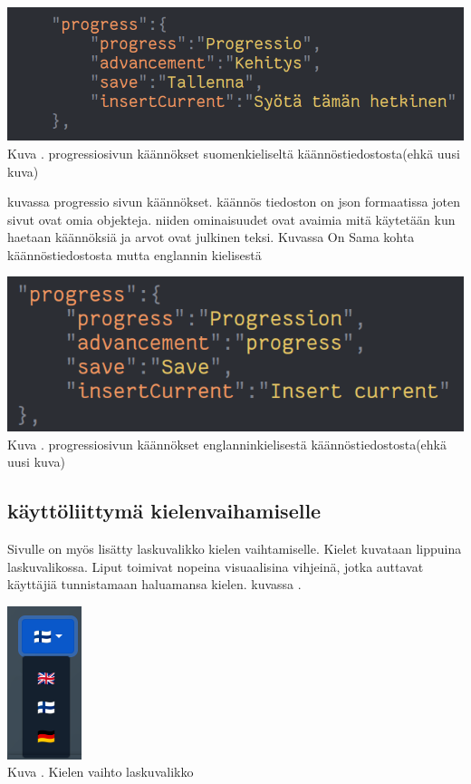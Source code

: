 \documentclass[11pt,a4paper,titlepage,oneside]{article}
\begin{document}
\includegraphics[width = 15cm]{src/public/oppar/translationfile.png}\\
Kuva \getImgCount. {} progressiosivun käännökset suomenkieliseltä käännöstiedostosta(ehkä uusi kuva)
\medskip

kuvassa progressio sivun käännökset. käännös tiedoston on json formaatissa joten sivut ovat omia objekteja. 
niiden ominaisuudet ovat avaimia mitä käytetään kun haetaan käännöksiä ja arvot ovat julkinen teksi.
Kuvassa \nextImageCount {} On Sama kohta käännöstiedostosta mutta englannin kielisestä
\medskip
\bigskip


\includegraphics[width = 15cm]{src/public/oppar/translationfileEng.png}\\
Kuva \getImgCount {}. progressiosivun käännökset englanninkielisestä käännöstiedostosta(ehkä uusi kuva)
\medskip




\subsection{käyttöliittymä kielenvaihamiselle}

Sivulle on myös lisätty laskuvalikko kielen vaihtamiselle. 
Kielet kuvataan lippuina laskuvalikossa.
Liput toimivat nopeina visuaalisina vihjeinä, jotka auttavat käyttäjiä tunnistamaan haluamansa kielen.
kuvassa \nextImageCount.



\bigskip
\includegraphics[]{src/public/locale_laskuvalikko.png}\\
Kuva \getImgCount {}. Kielen vaihto laskuvalikko
\end{document}
